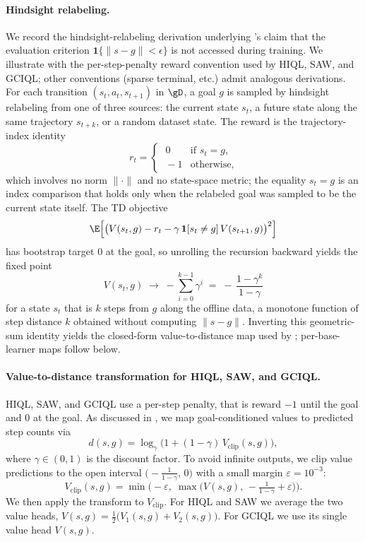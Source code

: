 \documentclass{article} %
\begin{document}
\paragraph{Hindsight relabeling.}
We record the hindsight-relabeling derivation underlying 's claim that the evaluation criterion $\mathbf{1}\{\|s-g\|<\epsilon\}$ is not accessed during training. We illustrate with the per-step-penalty reward convention used by HIQL, SAW, and GCIQL; other conventions (sparse terminal, etc.) admit analogous derivations. For each transition $(s_t, a_t, s_{t+1})$ in $\gD$, a goal $g$ is sampled by hindsight relabeling from one of three sources: the current state $s_t$, a future state along the same trajectory $s_{t+k}$, or a random dataset state. The reward is the trajectory-index identity
\[
    r_t = \begin{cases}\;0 & \text{if } s_t = g,\\\;-1 & \text{otherwise,}\end{cases}
\]
which involves no norm $\|\cdot\|$ and no state-space metric; the equality $s_t = g$ is an index comparison that holds only when the relabeled goal was sampled to be the current state itself. The TD objective
\[
    \E\!\left[\bigl(V(s_t,g) - r_t - \gamma\,\mathbf{1}[s_t \ne g]\,V(s_{t+1},g)\bigr)^2\right]
\]
has bootstrap target $0$ at the goal, so unrolling the recursion backward yields the fixed point
\[
    V(s_t,g) \;\longrightarrow\; -\sum_{i=0}^{k-1}\gamma^{i} \;=\; -\,\frac{1-\gamma^{k}}{1-\gamma}
\]
for a state $s_t$ that is $k$ steps from $g$ along the offline data, a monotone function of step distance $k$ obtained without computing $\|s-g\|$. Inverting this geometric-sum identity yields the closed-form value-to-distance map used by ; per-base-learner maps follow below.

\paragraph{Value-to-distance transformation for HIQL, SAW, and GCIQL.}
HIQL, SAW, and GCIQL use a per-step penalty, that is reward $-1$ until the goal and $0$ at the goal. As discussed in , we map goal-conditioned values to predicted step counts via
\[
    d(s,g)=\log_{\gamma}\!\big(1+(1-\gamma)\,V_{\text{clip}}(s,g)\big),
\]
where $\gamma\in(0,1)$ is the discount factor. To avoid infinite outputs, we clip value predictions to the open interval $\bigl(-\tfrac{1}{1-\gamma},\,0\bigr)$ with a small margin $\varepsilon=10^{-3}$:
\[
V_{\text{clip}}(s,g)=\min\!\bigl(-\varepsilon,\;\max\!\bigl(V(s,g),\,-\tfrac{1}{1-\gamma}+\varepsilon\bigr)\bigr).
\]
We then apply the transform to $V_{\text{clip}}$. For HIQL and SAW we average the two value heads, $V(s,g)=\tfrac{1}{2}\bigl(V_1(s,g)+V_2(s,g)\bigr)$. For GCIQL we use its single value head $V(s,g)$.
\end{document}
